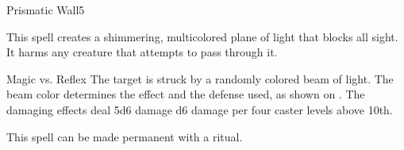 \begin{spellsection}{Prismatic Wall}{5}
\begin{spellheader}
\end{spellheader}
\begin{spellcontent}
    \begin{spelltargetinginfo}
    \end{spelltargetinginfo}
    \begin{spelleffects}
        \spelleffect This spell creates a shimmering, multicolored plane of light that blocks all sight. It harms any creature that attempts to pass through it.
        \spelldur \durshort \dismissable
    \end{spelleffects}
\end{spellcontent}
\begin{spellsubcontent}
    \begin{spelltargetinginfo}
    \end{spelltargetinginfo}
    \begin{spelleffects}
        \begin{spellattack}{Magic vs. Reflex}
            \spellspecial The target is struck by a randomly colored beam of light. The beam color determines the effect and the defense used, as shown on . The damaging effects deal 5d6 damage \add d6 damage per four caster levels above 10th.
        \end{spellattack}
    \end{spelleffects}
\end{spellsubcontent}
\begin{spellfooter}
    \spellnotes This spell can be made permanent with a  ritual.
\end{spellfooter}
\end{spellsection}

